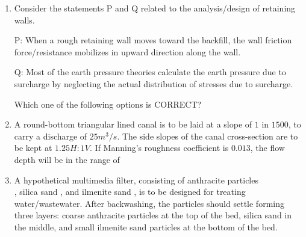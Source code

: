 \documentclass[journal,12pt,onecolumn]{article}
\theoremstyle{remark}
\begin{document}
\begin{enumerate}
    \item Consider the statements P and Q related to the analysis/design of retaining walls.
    
    P: When a rough retaining wall moves toward the backfill, the wall friction
    force/resistance mobilizes in upward direction along the wall.
    
    Q: Most of the earth pressure theories calculate the earth pressure due to surcharge
    by neglecting the actual distribution of stresses due to surcharge.
    
    Which one of the following options is CORRECT?
    
    \hfill{}
    \begin{enumerate}
    \end{enumerate}
    
    \item A round-bottom triangular lined canal is to be laid at a slope of $1$ in $1500$, to carry
    a discharge of $25 m^3/s$. The side slopes of the canal cross-section are to be kept at
    $1.25H:1V$. If Manning's roughness coefficient is $0.013$, the flow depth
     will be in the range of
    
    \hfill{}
    \begin{enumerate}
    \end{enumerate}

    \item A hypothetical multimedia filter, consisting of anthracite particles\\ , silica sand , and ilmenite sand ,
    is to be designed for treating water/wastewater. After backwashing, the particles
    should settle forming three layers: coarse anthracite particles at the top of the bed,
    silica sand in the middle, and small ilmenite sand particles at the bottom of the bed.
    

\end{enumerate}
\end{document}
